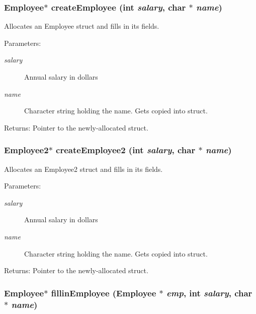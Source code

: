 \subsubsection{\setlength{\rightskip}{0pt plus 5cm}\bf{Employee}$\ast$ create\-Employee (int {\em salary}, char $\ast$ {\em name})}\label{employee_8c_eb7cb4c5c4779c2113e3daf270db2345}


Allocates an Employee struct and fills in its fields. \begin{Desc}
\item[Parameters:]
\begin{description}
\item[{\em salary}]Annual salary in dollars \item[{\em name}]Character string holding the name. Gets copied into struct. \end{description}
\end{Desc}
\begin{Desc}
\item[Returns:]Pointer to the newly-allocated struct. \end{Desc}
\subsubsection{\setlength{\rightskip}{0pt plus 5cm}\bf{Employee2}$\ast$ create\-Employee2 (int {\em salary}, char $\ast$ {\em name})}\label{employee_8c_a71e796ab3d70e452c5693e15f7d5f8a}


Allocates an Employee2 struct and fills in its fields. \begin{Desc}
\item[Parameters:]
\begin{description}
\item[{\em salary}]Annual salary in dollars \item[{\em name}]Character string holding the name. Gets copied into struct. \end{description}
\end{Desc}
\begin{Desc}
\item[Returns:]Pointer to the newly-allocated struct. \end{Desc}
\subsubsection{\setlength{\rightskip}{0pt plus 5cm}\bf{Employee}$\ast$ fillin\-Employee (\bf{Employee} $\ast$ {\em emp}, int {\em salary}, char $\ast$ {\em name})}\label{employee_8c_cff08fb0ab125ccc30b9aa63cef86f36}


